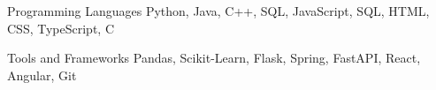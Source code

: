 

\begin{cvskills}

  \cvskill
    {Programming Languages} %
    {Python, Java, C++, SQL, JavaScript, SQL, HTML, CSS, TypeScript, C} %

  \cvskill
    {Tools and Frameworks} %
    {Pandas, Scikit-Learn, Flask, Spring, FastAPI, React, Angular, Git} %


\end{cvskills}
